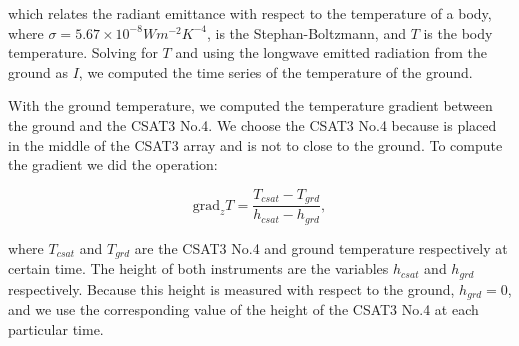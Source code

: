 \noindent which relates the radiant emittance with respect to the temperature of a body, where $\sigma = 5.67 \times 10^{-8} W m^{-2} K^{-4}$, is the Stephan-Boltzmann, and $T$ is the body temperature. Solving for $T$ and using the longwave emitted radiation from the ground as $I$, we computed the time series of the temperature of the ground.

With the ground temperature, we computed the temperature gradient between the ground and the CSAT3 No.4. We choose the CSAT3 No.4 because is placed in the middle of the CSAT3 array and is not to close to the ground. To compute the gradient we did the operation:

\begin{equation}
    \text{grad}_z T = \frac{T_{csat} - T_{grd}}{h_{csat} - h_{grd}},
\end{equation}

\noindent where $T_{csat}$ and $T_{grd}$ are the CSAT3 No.4 and ground temperature respectively at certain time. The height of both instruments are the variables $h_{csat}$ and $h_{grd}$ respectively. Because this height is measured with respect to the ground, $h_{grd} = 0$, and we use the corresponding value of the height of the CSAT3 No.4 at each particular time. 